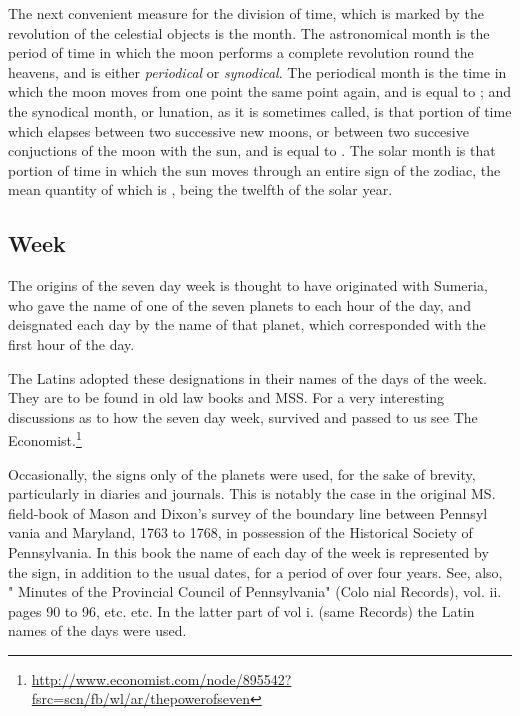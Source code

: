 The next convenient measure for the division of time, which is marked by the revolution of the
celestial objects is the month. The astronomical month is the period of time in which the moon 
performs a complete revolution round the heavens, and is either \textit{periodical} or \textit{synodical}. The periodical
month is the time in which the moon moves from one point the same point again, and is equal to ; and the synodical month, or lunation, as it is sometimes called, is that portion of time which
elapses between two successive new moons, or between two succesive conjuctions of the moon with the sun, and is equal to .  The solar month is that portion of time in which the sun moves through an
entire sign of the zodiac, the mean quantity of which is , being the twelfth of the
solar year.


\subsection{Week}

The origins of the seven day week is thought to have originated with Sumeria, who gave the name
of one of the seven planets to each hour of the day, and deisgnated each day by the name of that planet, which corresponded with the first hour of the day. 

The Latins adopted these designations in their names of 
the days of the week. They are to be found in old law books 
and MSS. For a very interesting discussions as to how the seven
day week, survived and passed to us see The Economist.\footnote{\protect\url{http://www.economist.com/node/895542?fsrc=scn/fb/wl/ar/thepowerofseven}}

Occasionally, the signs only of the planets were used, for 
the sake of brevity, particularly in diaries and journals. This 
is notably the case in the original MS. field-book of Mason 
and Dixon's survey of the boundary line between Pennsyl 
vania and Maryland, 1763 to 1768, in possession of the Historical 
Society of Pennsylvania. In this book the name of 
each day of the week is represented by the sign, in addition 
to the usual dates, for a period of over four years. See, also, 
" Minutes of the Provincial Council of Pennsylvania" (Colo 
nial Records), vol. ii. pages 90 to 96, etc. etc. In the latter 
part of vol i. (same Records) the Latin names of the days 
were used. 

